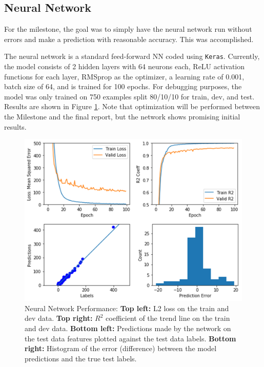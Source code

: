 \documentclass{article}
\begin{document}
	\subsection{Neural Network}
	
	For the milestone, the goal was to simply have the neural network run without errors and make a prediction with reasonable accuracy. This was accomplished. 
	
	The neural network is a standard feed-forward NN coded using \texttt{Keras}. Currently, the model consists of 2 hidden layers with 64 neurons each, ReLU activation functions for each layer, RMSprop as the optimizer, a learning rate of 0.001, batch size of 64, and is trained for 100 epochs. For debugging purposes, the model was only trained on 750 examples split 80/10/10 for train, dev, and test. Results are shown in Figure \ref*{fig:nn_perf}. Note that optimization will be performed between the Milestone and the final report, but the network shows promising initial results.
	
	\begin{figure}[H]
		\centering
		\includegraphics[scale=0.4]{"NN_error_analysis"}
		\caption{Neural Network Performance: \textbf{Top left:} L2 loss on the train and dev data. \textbf{Top right:} $R^2$ coefficient of the trend line on the train and dev data. \textbf{Bottom left:} Predictions made by the network on the test data features plotted against the test data labels. \textbf{Bottom right:} Histogram of the error (difference) between the model predictions and the true test labels.}
		\label{fig:nn_perf}
	\end{figure}	
	
\end{document}
